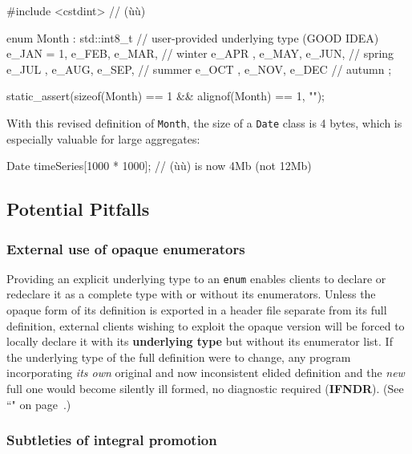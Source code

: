 \begin{emcppslisting}
#include <cstdint>  // (ù{}ù)

enum Month : std::int8_t  // user-provided underlying type (GOOD IDEA)
{
    e_JAN = 1, e_FEB, e_MAR,    // winter
    e_APR    , e_MAY, e_JUN,    // spring
    e_JUL    , e_AUG, e_SEP,    // summer
    e_OCT    , e_NOV, e_DEC     // autumn
};

static_assert(sizeof(Month) == 1 && alignof(Month) == 1, "");
\end{emcppslisting}

\noindent With this revised definition of \texttt{Month}, the size of a
\texttt{Date} class is 4 bytes, which is especially valuable for large
aggregates:

\begin{emcppslisting}[emcppsbatch=e1]
Date timeSeries[1000 * 1000];  // (ù{}ù) is now 4Mb (not 12Mb)
\end{emcppslisting}


\subsection[Potential Pitfalls]{Potential Pitfalls}\label{potential-pitfalls-underlyingenum}

\subsubsection[External use of opaque enumerators]{External use of opaque enumerators}\label{external-use-of-opaque-enumerators-enumunderlying}

Providing an explicit underlying type to an \texttt{enum} enables
clients to declare or redeclare it as a complete type with or without
its enumerators. Unless the opaque form of its definition is exported in
a header file separate from its full definition, external clients
wishing to exploit the opaque version will be forced to locally declare
it with its \textbf{underlying type} but without its enumerator list. If
the underlying type of the full definition were to change, any program
incorporating \emph{its own} original and now inconsistent elided
definition and the \emph{new} full one would become silently ill formed, no diagnostic required (\textbf{IFNDR}). (See ``" on page~\pageref{enumopaque}.)

\subsubsection[Subtleties of integral promotion]{Subtleties of integral promotion}\label{subtleties-of-integral-promotion}

